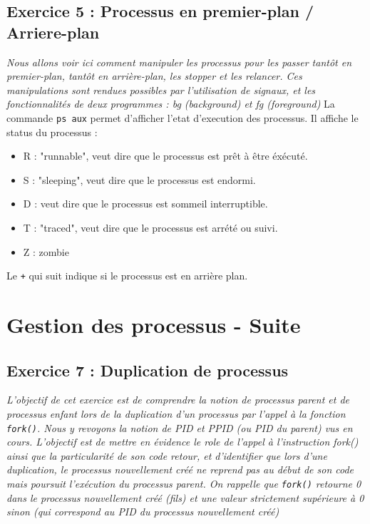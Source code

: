 \subsection{Exercice 5 : Processus en premier-plan / Arriere-plan}
\textit{Nous allons voir ici comment manipuler les processus pour les passer tantôt en premier-plan, tantôt en arrière-plan, les stopper et les relancer. Ces manipulations sont rendues possibles par l’utilisation de signaux, et les fonctionnalités de deux programmes : bg (background) et fg (foreground)}
La commande \texttt{ps aux} permet d'afficher l'etat d'execution des processus.
Il affiche le status du processus :
\begin{itemize}
\item R : "runnable", veut dire que le processus est prêt à être éxécuté.
\item S : "sleeping", veut dire que le processus est endormi.
\item D : veut dire que le processus est sommeil interruptible.
\item T : "traced", veut dire que le processus est arrété ou suivi.
\item Z : zombie
\end{itemize}
Le \texttt{+} qui suit indique si le processus est en arrière plan.


\section{Gestion des processus - Suite}

\subsection{Exercice 7 : Duplication de processus}
\textit{L’objectif de cet exercice est de comprendre la notion de processus parent et de processus enfant lors de la duplication d’un processus par l’appel à la fonction \texttt{fork()}. Nous y revoyons la notion de PID et PPID (ou PID du parent) vus en cours. L’objectif est de mettre en évidence le role de l’appel à l’instruction fork() ainsi que la particularité de son code retour, et d’identifier que lors d’une duplication, le processus nouvellement créé ne reprend pas au début de son code mais poursuit l’exécution du processus parent. On rappelle que \texttt{fork()} retourne 0 dans le processus nouvellement créé (fils) et une valeur strictement supérieure à 0 sinon (qui correspond au PID du processus nouvellement créé)}

